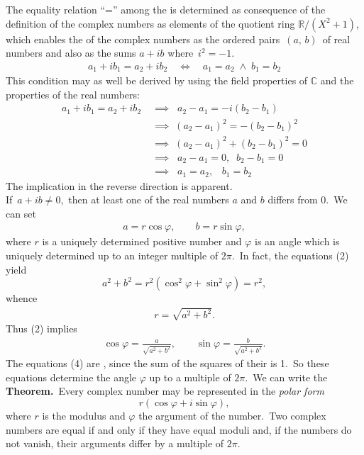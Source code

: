\documentclass[12pt]{article}
\theoremstyle{definition}
\begin{document}
The equality relation ``='' among the  is determined as consequence of the definition of the complex numbers as elements of the quotient ring $\mathbb{R}/(X^2\!+\!1)$, which enables the  of the complex numbers as the ordered pairs \,$(a,\,b)$\, of real numbers and also as the sums $a\!+\!ib$ where\, $i^2 = -1$.
\begin{align}
a_1+ib_1 = a_2+ib_2 \quad \Longleftrightarrow \quad a_1 = a_2\; \wedge\; b_1 = b_2
\end{align}
This condition may as well be derived by using the field properties of $\mathbb{C}$ and the properties of the real numbers:
\begin{align*}
a_1+ib_1 = a_2+ib_2\; & \implies\; \;a_2-a_1 = -i(b_2-b_1)\\
& \implies\; (a_2-a_1)^2 = -(b_2-b_1)^2\\ 
& \implies\;  (a_2-a_1)^2+(b_2-b_1)^2 = 0\\
& \implies\; \;a_2-a_1 = 0, \;\; b_2-b_1= 0\\
& \implies\; \;a_1 = a_2, \;\;\; b_1 = b_2
\end{align*}
The implication  in the reverse direction is apparent.\\


If\, $a+ib \neq 0$,\, then at least one of the real numbers $a$ and $b$ differs from 0.\, We can set
\begin{align}
a = r\cos\varphi, \qquad b = r\sin\varphi,
\end{align}
where $r$ is a uniquely determined positive number and $\varphi$ is an angle which is uniquely determined up to an integer multiple of $2\pi$.\, In fact, the equations (2) yield
$$a^2+b^2 = r^2(\cos^2\varphi+\sin^2\varphi) = r^2,$$
whence
\begin{align}
r = \sqrt{a^2+b^2}.
\end{align}
Thus (2) implies
\begin{align}
\cos\varphi = \frac{a}{\sqrt{a^2+b^2}}, \qquad \sin\varphi = \frac{b}{\sqrt{a^2+b^2}}.
\end{align}
The equations (4) are , since the sum of the squares of their  is 1.\, So these equations determine the angle $\varphi$ up to a multiple of $2\pi$.\, We can write the\\

\textbf{Theorem.}\, Every complex number may be represented in the {\em polar form}
$$r(\cos\varphi+i\sin\varphi),$$
where $r$ is the modulus and $\varphi$ the argument of the number.\, Two complex numbers are equal if and only if they have equal moduli and, if the numbers do not vanish, their arguments differ by a multiple of $2\pi$.


\end{document}
